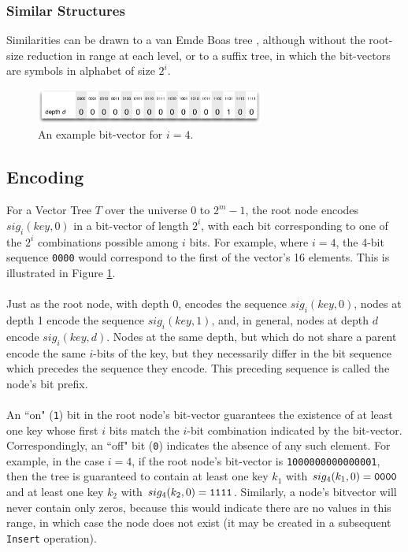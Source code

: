 \documentclass[11pt,letterpaper]{article}
\begin{document}
\subsubsection{Similar Structures}
Similarities can be drawn to a van Emde Boas tree \cite{wiki:001},
although without the root-size reduction in range at each level, or to a suffix tree, in
which the bit-vectors are symbols in alphabet of size $2^i$.

\begin{figure}[t]
	\center
	\includegraphics[width=75mm]{example-vector.pdf}
	\caption{An example bit-vector for $i=4$.}
	\label{fig:example-vector}
\end{figure}

\subsection{Encoding}
For a Vector Tree $T$ over the universe $0$ to $2^m - 1$, the root node
encodes $sig_i(key, 0)$ in a bit-vector of length $2^i$,
with each bit corresponding to one of the $2^i$ combinations possible
among $i$ bits.  For example, where $i=4$, the 4-bit sequence {\tt 0000}
would correspond to the first of the vector's 16 elements.  This is illustrated
in Figure \ref{fig:example-vector}.

\paragraph{}
Just as the root node, with depth 0, encodes the sequence $sig_i(key, 0)$,
nodes at depth 1 encode the sequence $sig_i(key, 1)$, and,
in general, nodes at depth $d$ encode $sig_i(key, d)$.  Nodes at the
same depth, but which do not share a parent encode the same $i$-bits
of the key, but they necessarily differ in the bit sequence which precedes
the sequence they encode.  This preceding sequence is called the node's
bit prefix.

\paragraph{}
An ``on" ({\tt 1}) bit in the root node's bit-vector guarantees the existence
of at least one key whose first $i$ bits match the $i$-bit combination
indicated by the bit-vector.  Correspondingly, an ``off" bit ({\tt 0}) indicates
the absence of any such element.  For example, in the case $i=4$,
if the root node's bit-vector is {\tt 1000000000000001}, then the tree is
guaranteed to contain at least one key $k_1$ with $sig_4(k_1, 0) = {\tt 0000}$
and at least one key $k_2$ with $sig_4(k_2, 0)={\tt 1111}$.  Similarly, a node's
bitvector will never contain only zeros, because this would indicate there are
no values in this range, in which case the node does not exist (it may be created
in a subsequent {\tt Insert} operation).
\end{document}
